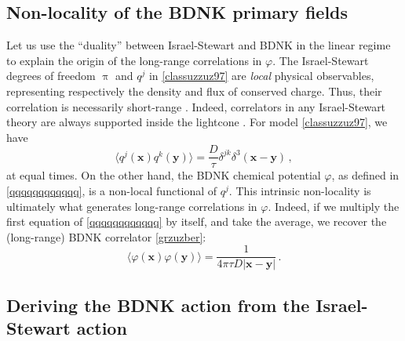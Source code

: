\documentclass[a4paper, amsfonts, amssymb, amsmath, reprint, showkeys, nofootinbib, twoside,notitlepage,onecolumn]{revtex4-2}
\newcommand{\x}{{\textbf{x}}}
\newcommand{\y}{{\textbf{y}}}
\theoremstyle{definition}
\begin{document}
\subsection{Non-locality of the BDNK primary fields}

Let us use the ``duality'' between Israel-Stewart and BDNK in the linear regime to explain the origin of the long-range correlations in $\varphi$. 
The Israel-Stewart degrees of freedom $\uppi$ and $q^j$ in \eqref{classuzzuz97} are \textit{local} physical observables, representing respectively the density and flux of conserved charge. Thus, their correlation is necessarily short-range \cite{landau9}. Indeed, correlators in any Israel-Stewart theory are always supported inside the lightcone \cite{Mullins:2023tjg}. For model \eqref{classuzzuz97}, we have
\begin{equation}
    \langle q^j(\textbf{x})q^k(\textbf{y})\rangle = \dfrac{D}{\tau} \delta^{jk} \delta^3(\textbf{x}-\textbf{y}) \, ,
\end{equation}
at equal times. On the other hand, the BDNK chemical potential $\varphi$, as defined in \eqref{qqqqqqqqqqqq}, is a non-local functional of $q^j$. This intrinsic non-locality is ultimately what generates long-range correlations in $\varphi$. Indeed, if we multiply the first equation of \eqref{qqqqqqqqqqqq} by itself, and take the average, we recover the (long-range) BDNK correlator \eqref{grzuzber}:
\begin{equation}
  \langle \varphi(\x)\varphi(\y)\rangle = \dfrac{1}{4\pi \tau D |\x -\y|}  \, .
\end{equation}

\subsection{Deriving the BDNK action from the Israel-Stewart action}
\end{document}
